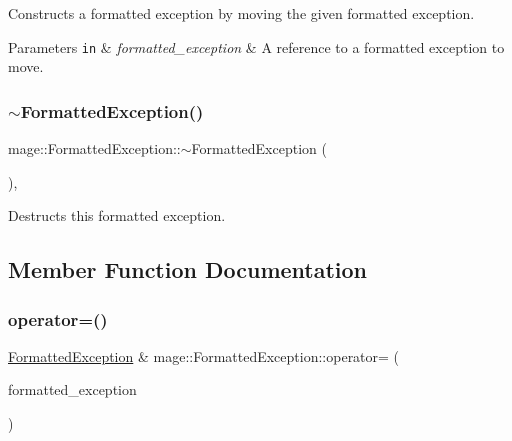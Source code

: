 Constructs a formatted exception by moving the given formatted exception.


\begin{DoxyParams}[1]{Parameters}
\mbox{\tt in}  & {\em formatted\+\_\+exception} & A reference to a formatted exception to move. \\
\hline
\end{DoxyParams}
\hypertarget{structmage_1_1_formatted_exception_a7bd56fe92b62d08b5ca4fb86592f1302}{}\label{structmage_1_1_formatted_exception_a7bd56fe92b62d08b5ca4fb86592f1302} 
\subsubsection{\texorpdfstring{$\sim$\+Formatted\+Exception()}{~FormattedException()}}
{\footnotesize\ttfamily mage\+::\+Formatted\+Exception\+::$\sim$\+Formatted\+Exception (\begin{DoxyParamCaption}{ }\end{DoxyParamCaption})\hspace{0.3cm}{\ttfamily [virtual]}, {\ttfamily [default]}}

Destructs this formatted exception. 

\subsection{Member Function Documentation}
\hypertarget{structmage_1_1_formatted_exception_acc0ecbe1d510c5103ff4fd5b7054213b}{}\label{structmage_1_1_formatted_exception_acc0ecbe1d510c5103ff4fd5b7054213b} 
\subsubsection{\texorpdfstring{operator=()}{operator=()}\hspace{0.1cm}{\footnotesize\ttfamily [1/2]}}
{\footnotesize\ttfamily \hyperlink{structmage_1_1_formatted_exception}{Formatted\+Exception} \& mage\+::\+Formatted\+Exception\+::operator= (\begin{DoxyParamCaption}\item[{const \hyperlink{structmage_1_1_formatted_exception}{Formatted\+Exception} \&}]{formatted\+\_\+exception }\end{DoxyParamCaption})\hspace{0.3cm}{\ttfamily [default]}}

